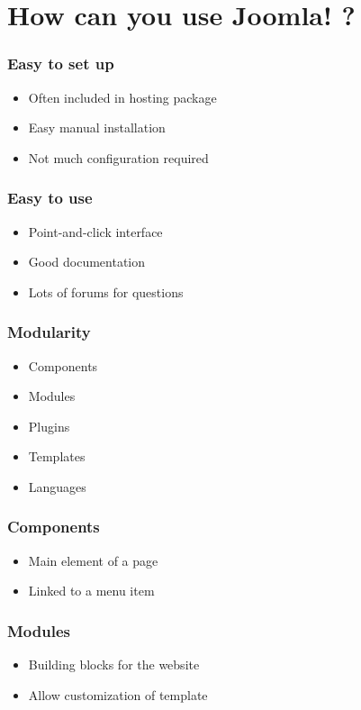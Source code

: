 \section{How can you use Joomla! ?}
\setcounter{subsection}{1}

\begin{frame}
\frametitle{Easy to set up}
  \begin{itemize}[<+->]
    \item Often included in hosting package
    \item Easy manual installation
    \item Not much configuration required
  \end{itemize}
\end{frame}

\begin{frame}
\frametitle{Easy to use}
  \begin{itemize}[<+->]
    \item Point-and-click interface
    \item Good documentation
    \item Lots of forums for questions
  \end{itemize}
\end{frame}

\begin{frame}
\frametitle{Modularity}
  \begin{itemize}[<+->]
    \item Components
    \item Modules
    \item Plugins
    \item Templates
    \item Languages
  \end{itemize}
\end{frame}

\begin{frame}
\frametitle{Components}
  \begin{itemize}[<+->]
    \item Main element of a page
    \item Linked to a menu item
  \end{itemize}
\end{frame}

\begin{frame}
\frametitle{Modules}
  \begin{itemize}[<+->]
    \item Building blocks for the website
    \item Allow customization of template
  \end{itemize}
\end{frame}

